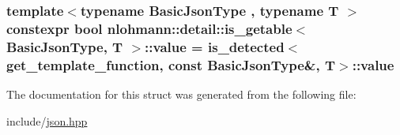 \subsubsection[{\texorpdfstring{value}{value}}]{\setlength{\rightskip}{0pt plus 5cm}template$<$typename Basic\+Json\+Type , typename T $>$ constexpr bool {\bf nlohmann\+::detail\+::is\+\_\+getable}$<$ Basic\+Json\+Type, T $>$\+::value = {\bf is\+\_\+detected}$<${\bf get\+\_\+template\+\_\+function}, const Basic\+Json\+Type\&, T$>$\+::value\hspace{0.3cm}{\ttfamily [static]}}\hypertarget{structnlohmann_1_1detail_1_1is__getable_a2150b5b5398683147928a61c99cd0070}{}\label{structnlohmann_1_1detail_1_1is__getable_a2150b5b5398683147928a61c99cd0070}


The documentation for this struct was generated from the following file\+:\begin{DoxyCompactItemize}
\item 
include/\hyperlink{json_8hpp}{json.\+hpp}\end{DoxyCompactItemize}

